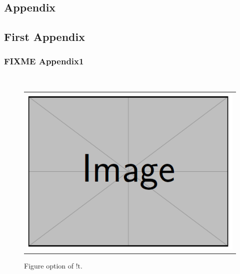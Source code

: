 \appendix
\newpage
\makeatletter
\makeatother
\begin{appendices}
\chapter*{Appendix}
\renewcommand{\thesection}{\Alph{section}}
\renewcommand\thetable{\thesection.\arabic{table}}  
\renewcommand\thefigure{\thesection.\arabic{figure}}  

\section{First Appendix}
\subsection{FIXME Appendix1}
\lipsum[1-2]~\cite{anderson1964hard}
\begin{figure}[!t]
	{
	\begin{center}
		\begin{tabular}{c}
			\includegraphics[width=0.9\linewidth]{dummy.png}
		\end{tabular}
	\end{center}
	}
	\caption[dummy image FIXME A1]{Figure option of $!\text{t}$.}
\label{dummy_imgA1}
\end{figure}

\end{appendices}
